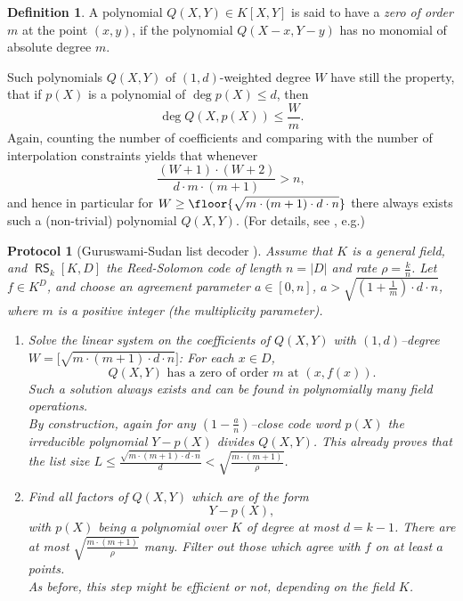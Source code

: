 \documentclass[11pt,article,oneside]{memoir}
\newtheorem{protocol}[]{Protocol}
\theoremstyle{definition}
\newtheorem{defn}[thm]{Definition}
\theoremstyle{remark}
\DeclareMathOperator{\RS}{\mathsf{RS}}
\begin{document}
\begin{defn}
A polynomial $Q(X,Y)\in K[X,Y]$ is said to have a \textit{zero of order $m$} at the point $(x,y)$, if the polynomial $Q(X-x,Y-y)$ has no monomial of absolute degree $m$.
\end{defn}

Such polynomials $Q(X,Y)$ of $(1,d)$-weighted degree $W$ have still the property, that if $p(X)$ is a polynomial of $\deg p(X) \leq d$, then 
\[
\deg Q(X,p(X))\leq \frac{W}{m}.
\] 
Again, counting the number of coefficients and comparing with the number of interpolation constraints yields that whenever 
\[
\frac{(W+1)\cdot (W+2)}{d \cdot m \cdot (m+1)} > n,
\]
and hence in particular for
$
W \geq \floor{\sqrt{m\cdot (m+1) \cdot d\cdot n}}
$
there always exists such a (non-trivial) polynomial $Q(X,Y)$.
(For details, see \cite{ListDecodingBook}, e.g.)

\begin{protocol}[Guruswami-Sudan list decoder \cite{GuruswamiSudan}] 
\label{p:GuruswamiSudan}
Assume that $K$ is a general field, and $\RS_k[K,D]$ the Reed-Solomon code of length $n= |D|$ and rate $\rho=\frac{k}{n}$.
Let $f\in K^D$, and choose an agreement parameter $a\in [0,n]$,  
$a > \sqrt{\left(1 + \frac{1}{m}\right) \cdot d\cdot n}$,
where $m$ is a positive integer (the \textit{multiplicity parameter}).
\begin{enumerate}
\item
Solve the linear system on the coefficients of  $Q(X,Y)$ with $(1,d)$--degree $W = \big[\sqrt{m\cdot (m+1)\cdot d\cdot n}\big]$: 
For each $x\in D$,
\[ 
Q(X,Y)\text{ has a zero of order $m$ at } (x, f(x)).
\]
Such a solution always exists and can be found in polynomially many field operations.
\\
{\tiny
By construction, again for any $\left(1-\frac{a}{n}\right)$--close code word $p(X)$ the irreducible polynomial $Y-p(X)$ divides $Q(X,Y)$.
This already proves that the list size $L\leq \frac{\sqrt{m\cdot (m+1)\cdot d\cdot n}}{d} < \sqrt{\frac{m\cdot (m+1)}{\rho}}$.  
}
\item
Find all factors of $Q(X,Y)$ which are of the form
\[
Y - p(X),
\] 
with $p(X)$ being a polynomial over $K$ of degree at most $d=k-1$. 
There are at most $\sqrt{\frac{m\cdot (m+1)}{\rho}}$ many. 
Filter out those which agree with $f$ on at least $a$ points.
\\
{\tiny
As before, this step might be efficient or not, depending on the field $K$.
}
\end{enumerate}
\end{protocol}
\end{document}
